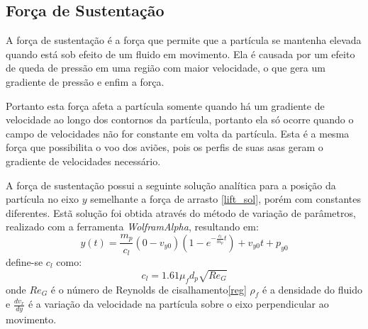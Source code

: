 \subsection{\textbf{Força de Sustentação}}
\label{sec_lift}
A força de sustentação é a força que permite que a partícula se mantenha elevada quando está sob efeito de um fluido em movimento.
Ela é causada por um efeito de queda de pressão em uma região com maior velocidade, o que gera um gradiente de pressão e enfim a força.

Portanto esta força afeta a partícula somente quando há um gradiente de velocidade ao longo dos contornos da partícula, portanto ela só ocorre quando o campo de velocidades não for constante em volta da partícula.
Esta é a mesma força que possibilita o voo dos aviões, pois os perfis de suas asas geram o gradiente de velocidades necessário.

A força de sustentação possui a seguinte solução analítica para a posição da partícula no eixo $y$ semelhante a força de arrasto \eqref{lift_sol}, porém com constantes diferentes.
Estã solução foi obtida através do método de variação de parâmetros, realizado com a ferramenta \textit{WolframAlpha}, resultando em:
\begin{equation}
    y(t) = \dfrac{m_p}{c_l} (0 - v_{y0}) \left(1 - e^{-\frac{c_l}{m_p}t}\right) + v_{y0}t + p_{y0}
    \label{lift_sol} 
\end{equation}
define-se $c_l$ como:
\begin{equation}
    c_l = 1.61 \mu_f d_p \sqrt{{Re}_G}
    \label{lift_c} 
\end{equation}
onde $Re_G$ é o número de Reynolds de cisalhamento\eqref{reg} $\rho_f$ é a densidade do fluido e $\tfrac{dv_x}{dy}$ é a variação da velocidade na partícula sobre o eixo perpendicular ao movimento.

